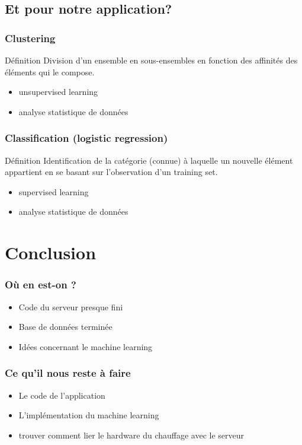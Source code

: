 \documentclass{beamer}
\begin{document}
\subsection{Et pour notre application?}
\begin{frame}
\frametitle{Clustering}
\begin{alertblock}{Définition}
Division d'un ensemble en sous-ensembles en fonction des affinités des éléments qui le compose.
\end{alertblock}
\begin{itemize}
\item unsupervised learning
\item analyse statistique de données
\end{itemize}
\end{frame}

\begin{frame}
\frametitle{Classification (logistic regression)}
\begin{alertblock}{Définition}
Identification de la catégorie (connue) à laquelle un nouvelle élément appartient en se basant sur l'observation d'un training set.
\end{alertblock}
\begin{itemize}
\item supervised learning
\item analyse statistique de données
\end{itemize}
\end{frame}

\section{Conclusion}

\begin{frame}
\frametitle{Où en est-on ?}
\begin{itemize}
  \item Code du serveur presque fini
  \item Base de données terminée
  \item Idées concernant le machine learning
\end{itemize}
\end{frame}

\begin{frame}
\frametitle{Ce qu'il nous reste à faire}
\begin{itemize}
  \item Le code de l'application
  \item L'implémentation du machine learning
  \item trouver comment lier le hardware du chauffage avec le serveur
\end{itemize}
\end{frame}
\end{document}

